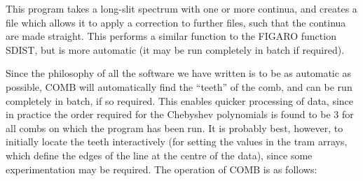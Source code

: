 This program takes a long-slit spectrum with one or more continua, and
creates a file which allows it to apply a correction to further files,
such that the continua are made straight.
This performs a similar function to the FIGARO function SDIST, but is
more automatic (it may be run completely in batch if required). 

Since the philosophy of all the software we have written is to be as
automatic as possible, COMB will automatically find the ``teeth'' of
the comb, and can be run completely in batch, if so required. This
enables quicker processing of data, since in practice the order
required for the Chebyshev polynomials is
found to be 3 for all combs on which the program has been run. It is
probably best, however, to initially locate the teeth interactively
(for setting the values in the tram arrays, which define the edges of
the line at the centre of the data), since some experimentation may be
required. The operation of COMB is as follows:
